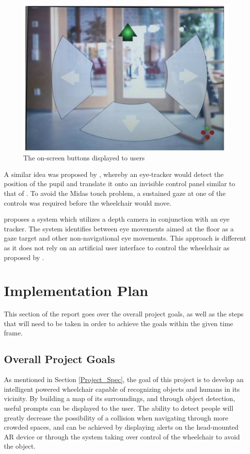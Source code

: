 \documentclass[12pt,a4paper]{report}
\begin{document}
\begin{figure}[h!]
	\begin{center}
		\includegraphics[scale=0.4]{Images/Literature/Wastlund_AR_Screen.png}
		\caption{The on-screen buttons displayed to users \citep{Wastlund2010}}
	\end{center}
\end{figure}

A similar idea was proposed by \cite{Arai2011}, whereby an eye-tracker would detect the position of the pupil and translate it onto an invisible control panel similar to that of \cite{Wastlund2010}. To avoid the Midas touch problem, a sustained gaze at one of the controls was required before the wheelchair would move.

\cite{Raymond2018} proposes a system which utilizes a depth camera in conjunction with an eye tracker. The system identifies between eye movements aimed at the floor as a gaze target and other non-navigational eye movements. This approach is different as it does not rely on an artificial user interface to control the wheelchair as proposed by \cite{Arai2011, Wastlund2010}.


\newpage
\chapter{Implementation Plan}
This section of the report goes over the overall project goals, as well as the steps that will need to be taken in order to achieve the goals within the given time frame.

\section{Overall Project Goals}
As mentioned in Section \ref{Project_Spec}, the goal of this project is to develop an intelligent powered wheelchair capable of recognizing objects and humans in its vicinity. By building a map of its surroundings, and through object detection, useful prompts can be displayed to the user. The ability to detect people will greatly decrease the possibility of a collision when navigating through more crowded spaces, and can be achieved by displaying alerts on the head-mounted AR device or through the system taking over control of the wheelchair to avoid the object.
\end{document}

